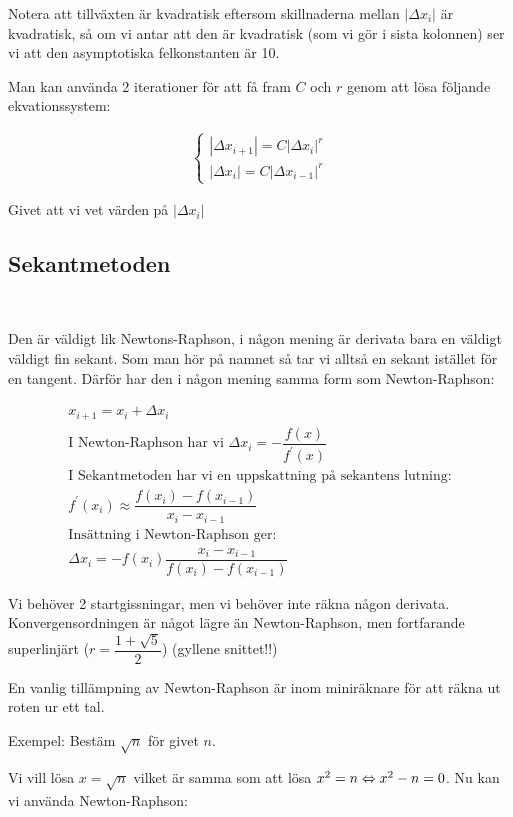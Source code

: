 \noindent Notera att tillväxten är kvadratisk eftersom skillnaderna mellan $\left|\Delta x_i\right|$ är kvadratisk, så om vi antar att den är kvadratisk (som vi gör i sista kolonnen) ser vi att den asymptotiska felkonstanten är 10.
\par\bigskip
\noindent Man kan använda 2 iterationer för att få fram $C$ och $r$ genom att lösa följande ekvationssystem:


\begin{equation*}
  \begin{gathered}
    \begin{cases*}
      \left|\Delta x_{i+1}\right| = C\left|\Delta x_i\right|^r\\
      \left|\Delta x_i\right| = C\left|\Delta x_{i-1}\right|^r
    \end{cases*}
  \end{gathered}
\end{equation*}\par
\noindent Givet att vi vet värden på $\left|\Delta x_i\right|$

\subsection{Sekantmetoden}\hfill\\
\par\bigskip
\noindent Den är väldigt lik Newtons-Raphson, i någon mening är derivata bara en väldigt väldigt fin sekant. Som man hör på namnet så tar vi alltså en sekant istället för en tangent. Därför har den i någon mening samma form som Newton-Raphson:


\begin{equation*}
  \begin{gathered}
    x_{i+1} = x_i+\Delta x_i\\
    \text{I Newton-Raphson har vi } \Delta x_i = -\dfrac{f(x)}{f^{\prime}(x)}\\
    \text{I Sekantmetoden har vi en uppskattning på sekantens lutning:}\\
    f^{\prime}(x_i)\approx \dfrac{f(x_i)-f(x_{i-1})}{x_i-x_{i-1}}\\
    \text{Insättning i Newton-Raphson ger:}\\
    \Delta x_i = -f(x_i)\dfrac{x_i-x_{i-1}}{f(x_i)-f(x_{i-1})}
  \end{gathered}
\end{equation*}
\par\bigskip
\noindent Vi behöver 2 startgissningar, men vi behöver inte räkna någon derivata. Konvergensordningen är något lägre än Newton-Raphson, men fortfarande superlinjärt ($r=\dfrac{1+\sqrt{5}}{2}$) (gyllene snittet!!)
\par\bigskip
\noindent En vanlig tillämpning av Newton-Raphson är inom miniräknare för att räkna ut roten ur ett tal.
\par\bigskip
\noindent Exempel: Bestäm $\sqrt{n}$ för givet $n$.\par
\noindent Vi vill lösa $x=\sqrt{n}$ vilket är samma som att lösa $x^2=n\Leftrightarrow x^2-n=0$. Nu kan vi använda Newton-Raphson:

